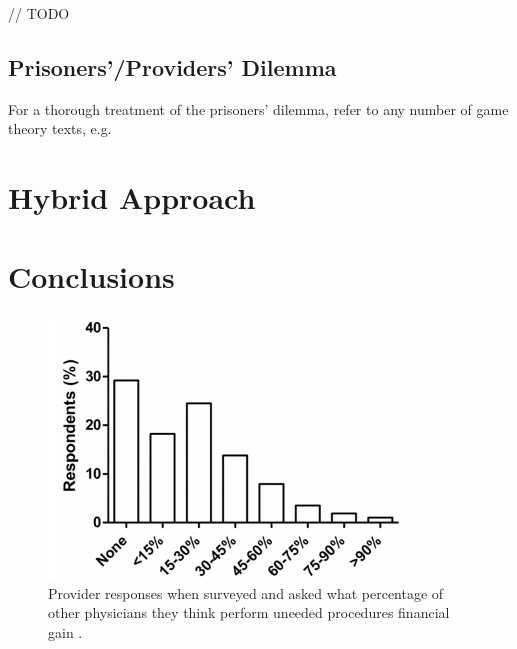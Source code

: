\documentclass{article}
\begin{document}
// TODO

\subsection*{Prisoners'/Providers' Dilemma}
For a thorough treatment of the prisoners' dilemma, refer to any number of game theory texts, e.g. \cite{networks}


\section{Hybrid Approach}

\section{Conclusions}




\begin{figure}
\includegraphics[height=7cm]{overtreat}
\centering
\caption{Provider responses when surveyed and asked what percentage of other physicians they think perform uneeded procedures financial gain \cite{overtreat}.}
\label{fig:overtreat}
\end{figure}


\clearpage
\end{document}

